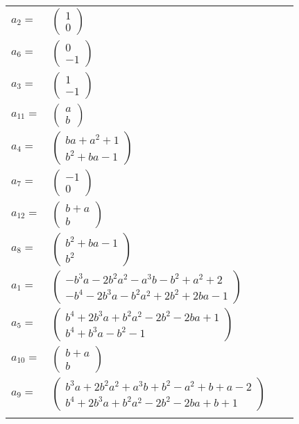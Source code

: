 \documentclass[1p]{elsarticle_modified}
\theoremstyle{definition}
\begin{document}
\begin{tabular}{m{7pt} m{180pt} m{7pt} m{180pt} }
\flushright $a_{2}=$&$\begin{pmatrix}1\\0\end{pmatrix}$ \\
\flushright $a_{6}=$&$\begin{pmatrix}0\\-1\end{pmatrix}$ \\
\flushright $a_{3}=$&$\begin{pmatrix}1\\-1\end{pmatrix}$ \\
\flushright $a_{11}=$&$\begin{pmatrix}a\\b\end{pmatrix}$ \\
\flushright $a_{4}=$&$\begin{pmatrix}b a+a^2+1\\b^2+b a-1\end{pmatrix}$ \\
\flushright $a_{7}=$&$\begin{pmatrix}-1\\0\end{pmatrix}$ \\
\flushright $a_{12}=$&$\begin{pmatrix}b+a\\b\end{pmatrix}$ \\
\flushright $a_{8}=$&$\begin{pmatrix}b^2+b a-1\\b^2\end{pmatrix}$ \\
\flushright $a_{1}=$&$\begin{pmatrix}- b^3 a-2 b^2 a^2- a^3 b- b^2+a^2+2\\- b^4-2 b^3 a- b^2 a^2+2 b^2+2 b a-1\end{pmatrix}$ \\
\flushright $a_{5}=$&$\begin{pmatrix}b^4+2 b^3 a+b^2 a^2-2 b^2-2 b a+1\\b^4+b^3 a- b^2-1\end{pmatrix}$ \\
\flushright $a_{10}=$&$\begin{pmatrix}b+a\\b\end{pmatrix}$ \\
\flushright $a_{9}=$&$\begin{pmatrix}b^3 a+2 b^2 a^2+a^3 b+b^2- a^2+b+a-2\\b^4+2 b^3 a+b^2 a^2-2 b^2-2 b a+b+1\end{pmatrix}$\\&\end{tabular}
\end{document}
